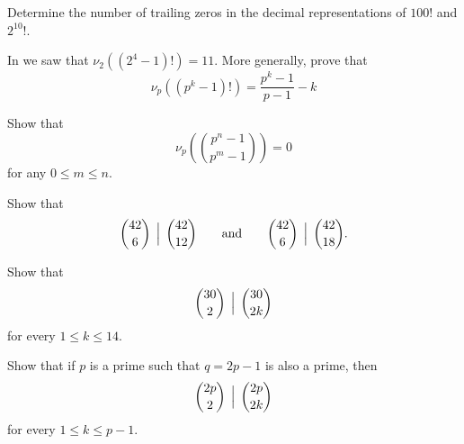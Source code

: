 \begin{routine}
  \exercise Determine the number of trailing zeros in the decimal representations of $100!$ and $2^{10}!$.
  \exercise
  \begin{subexenum}
  \item In  we saw that $\nu_2((2^4-1)!)=11$. More generally, prove that
  \begin{equation*}
    \nu_p((p^k-1)!)=\frac{p^k-1}{p-1}-k
  \end{equation*}
  \item Show that
  \begin{equation*}
    \nu_p\left(\binom{p^n-1}{p^m-1}\right)=0
  \end{equation*}
  for any $0\leq m\leq n$.
  \end{subexenum}
  \exercise Show that
  \begin{equation*}
    \binom{42}{6}\,\Bigm|\,\binom{42}{12}\qquad\text{and}\qquad \binom{42}{6}\,\Bigm|\,\binom{42}{18}.
  \end{equation*}
  \exercise
  \begin{subexenum}
  \item Show that
    \begin{equation*}
      \binom{30}{2}\,\Bigm|\,\binom{30}{2k}
    \end{equation*}
    for every $1\leq k\leq 14$.
  \item Show that if $p$ is a prime such that $q=2p-1$ is also a prime, then
    \begin{equation*}
      \binom{2p}{2}\,\Bigm|\,\binom{2p}{2k}
    \end{equation*}
    for every $1\leq k\leq p-1$.
  \end{subexenum}
  \exercise \label{exercise:fractions-lcm}
  \begin{subexenum}

\end{subexenum}
\end{routine}
